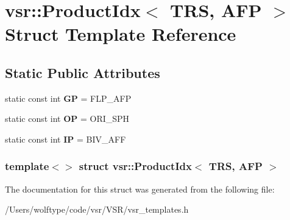 \hypertarget{structvsr_1_1_product_idx_3_01_t_r_s_00_01_a_f_p_01_4}{\section{vsr\-:\-:Product\-Idx$<$ T\-R\-S, A\-F\-P $>$ Struct Template Reference}
\label{structvsr_1_1_product_idx_3_01_t_r_s_00_01_a_f_p_01_4}
}
\subsection*{Static Public Attributes}
\begin{DoxyCompactItemize}
\item 
\hypertarget{structvsr_1_1_product_idx_3_01_t_r_s_00_01_a_f_p_01_4_a55740926212a7c1c82e6bfeb26fa1007}{static const int {\bfseries G\-P} = F\-L\-P\-\_\-\-A\-F\-P}\label{structvsr_1_1_product_idx_3_01_t_r_s_00_01_a_f_p_01_4_a55740926212a7c1c82e6bfeb26fa1007}

\item 
\hypertarget{structvsr_1_1_product_idx_3_01_t_r_s_00_01_a_f_p_01_4_aa32a0ea282c1c07da61548f4554cc02b}{static const int {\bfseries O\-P} = O\-R\-I\-\_\-\-S\-P\-H}\label{structvsr_1_1_product_idx_3_01_t_r_s_00_01_a_f_p_01_4_aa32a0ea282c1c07da61548f4554cc02b}

\item 
\hypertarget{structvsr_1_1_product_idx_3_01_t_r_s_00_01_a_f_p_01_4_a2377189b03eaf2cd40f54a3bfa3e5d72}{static const int {\bfseries I\-P} = B\-I\-V\-\_\-\-A\-F\-F}\label{structvsr_1_1_product_idx_3_01_t_r_s_00_01_a_f_p_01_4_a2377189b03eaf2cd40f54a3bfa3e5d72}

\end{DoxyCompactItemize}
\subsubsection*{template$<$$>$ struct vsr\-::\-Product\-Idx$<$ T\-R\-S, A\-F\-P $>$}



The documentation for this struct was generated from the following file\-:\begin{DoxyCompactItemize}
\item 
/\-Users/wolftype/code/vsr/\-V\-S\-R/vsr\-\_\-templates.\-h\end{DoxyCompactItemize}
